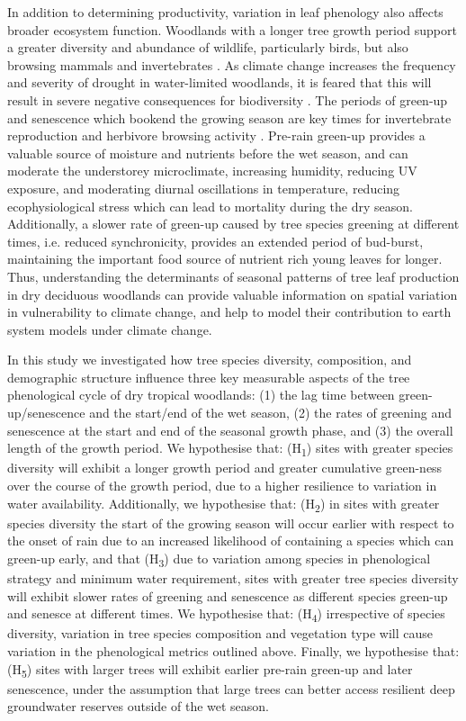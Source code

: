 \documentclass[11pt,a4paper]{article}
\begin{document}
In addition to determining productivity, variation in leaf phenology also affects broader ecosystem function. Woodlands with a longer tree growth period support a greater diversity and abundance of wildlife, particularly birds, but also browsing mammals and invertebrates \citep{Cole2015, Araujo2017, Morellato2016, Ogutu2013}. As climate change increases the frequency and severity of drought in water-limited woodlands, it is feared that this will result in severe negative consequences for biodiversity \citep{Bale2002}. The periods of green-up and senescence which bookend the growing season are key times for invertebrate reproduction \citep{Prather2012} and herbivore browsing activity \citep{Velasque2016, Morellato2016}. Pre-rain green-up provides a valuable source of moisture and nutrients before the wet season, and can moderate the understorey microclimate, increasing humidity, reducing UV exposure, and moderating diurnal oscillations in temperature, reducing ecophysiological stress which can lead to mortality during the dry season. Additionally, a slower rate of green-up caused by tree species greening at different times, i.e. reduced synchronicity, provides an extended period of bud-burst, maintaining the important food source of nutrient rich young leaves for longer. Thus, understanding the determinants of seasonal patterns of tree leaf production in dry deciduous woodlands can provide valuable information on spatial variation in vulnerability to climate change, and help to model their contribution to earth system models under climate change.
 
In this study we investigated how tree species diversity, composition, and demographic structure influence three key measurable aspects of the tree phenological cycle of dry tropical woodlands: (1) the lag time between green-up/senescence and the start/end of the wet season, (2) the rates of greening and senescence at the start and end of the seasonal growth phase, and (3) the overall length of the growth period. We hypothesise that: (H\textsubscript{1}) sites with greater species diversity will exhibit a longer growth period and greater cumulative green-ness over the course of the growth period, due to a higher resilience to variation in water availability. Additionally, we hypothesise that: (H\textsubscript{2}) in sites with greater species diversity the start of the growing season will occur earlier with respect to the onset of rain due to an increased likelihood of containing a species which can green-up early, and that (H\textsubscript{3}) due to variation among species in phenological strategy and minimum water requirement, sites with greater tree species diversity will exhibit slower rates of greening and senescence as different species green-up and senesce at different times. We hypothesise that: (H\textsubscript{4}) irrespective of species diversity, variation in tree species composition and vegetation type will cause variation in the phenological metrics outlined above. Finally, we hypothesise that: (H\textsubscript{5}) sites with larger trees will exhibit earlier pre-rain green-up and later senescence, under the assumption that large trees can better access resilient deep groundwater reserves outside of the wet season.
\end{document}
